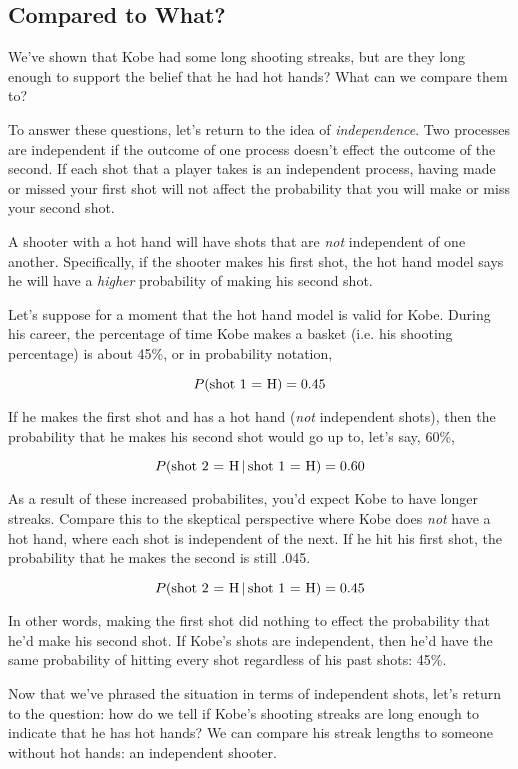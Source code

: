 \documentclass[11pt]{article}
\begin{document}
%

\subsection*{Compared to What?}
We've shown that Kobe had some long shooting streaks, but are they long enough to support the belief that he had hot hands?  What can we compare them to?

To answer these questions, let's return to the idea of \emph{independence}.  Two processes are independent if the outcome of one process doesn't effect the outcome of the second.  If each shot that a player takes is an independent process, having made or missed your first shot will not affect the probability that you will make or miss your second shot.

A shooter with a hot hand will have shots that are \emph{not} independent of one another.  Specifically, if the shooter makes his first shot, the hot hand model says he will have a \emph{higher} probability of making his second shot.

Let's suppose for a moment that the hot hand model is valid for Kobe.  During his career, the percentage of time Kobe makes a basket (i.e. his shooting percentage) is about 45\%, or in probability notation,

\[ P(\textnormal{shot 1 = H}) = 0.45 \]

If he makes the first shot and has a hot hand (\emph{not} independent shots), then the probability that he makes his second shot would go up to, let's say, 60\%,

\[ P\textnormal{(shot 2 = H} \, | \, \textnormal{shot 1 = H}) = 0.60 \]

As a result of these increased probabilites, you'd expect Kobe to have longer streaks.  Compare this to the skeptical perspective where Kobe does \emph{not} have a hot hand, where each shot is independent of the next.  If he hit his first shot, the probability that he makes the second is still .045.

\[ P(\textnormal{shot 2 = H} \, | \, \textnormal{shot 1 = H}) = 0.45 \]

In other words, making the first shot did nothing to effect the probability that he'd make his second shot.  If Kobe's shots are independent, then he'd have the same probability of hitting every shot regardless of his past shots: 45\%.

Now that we've phrased the situation in terms of independent shots, let's return to the question: how do we tell if Kobe's shooting streaks are long enough to indicate that he has hot hands?  We can compare his streak lengths to someone without hot hands: an independent shooter.  
\end{document}
